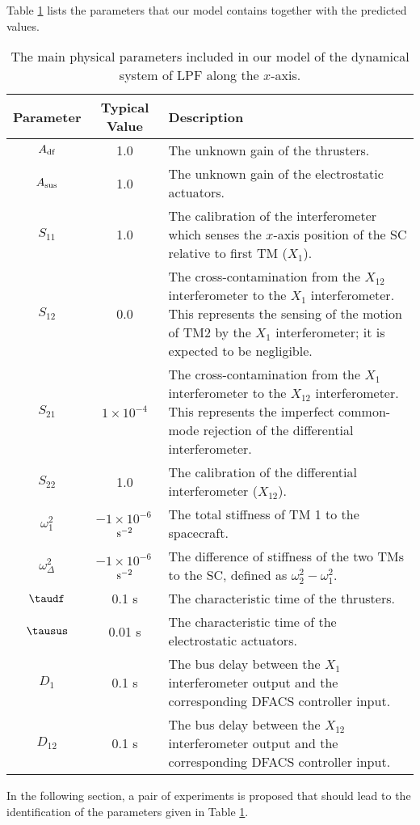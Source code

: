 Table \ref{tab:params} lists the parameters that our model contains together with the predicted values.
\begin{table}[htdp]
\begin{center}
  \small
\begin{tabular}{|c|c|p{8cm}|} \hline
	\rowcolor[rgb]{0.8,0.8,0.8} Parameter & Typical Value & Description \\ \hline \hline
    $A_{\rm df}$  & 1.0 & The unknown gain of the thrusters. \\ \hline
    $A_{\rm sus}$ & 1.0 & The unknown gain of the electrostatic actuators. \\ \hline
    $S_{11}$  & 1.0 & The calibration of the interferometer which
senses the $x$-axis position of the SC relative to first TM ($X_1$). \\ \hline 
    $S_{12}$ & 0.0 & The cross-contamination from the $X_{12}$
interferometer to the $X_{1}$ interferometer. This represents the sensing of the motion of TM2 by the $X_1$ interferometer; it is expected to be negligible. \\ \hline
    $S_{21}$  & $1\times10^{-4}$ & The cross-contamination from the $X_{1}$ interferometer
to the $X_{12}$ interferometer. This represents the imperfect common-mode
rejection of the differential interferometer. \\ \hline
    $S_{22}$ & 1.0 & The calibration of the differential interferometer
($X_{12}$). \\ \hline
    $\omega_1^2$  & $-1\times10^{-6}$\,${\rm s}^{-2}$ & The total stiffness of TM 1 to the spacecraft. \\ \hline
    $\omega_{\Delta}^2$  & $-1\times10^{-6}$\,${\rm s}^{-2}$ & The difference of stiffness 
of the two TMs to the SC, defined as $\omega_{2}^2-\omega_1^2$. \\ \hline
    $\taudf$ & 0.1 s& The characteristic time of the thrusters. \\ \hline
    $\tausus$ & 0.01 s& The characteristic time of the electrostatic actuators. \\ \hline
    $D_{1}$  & 0.1 s& The bus delay between the $X_1$ interferometer output and the corresponding DFACS controller input. \\ \hline
    $D_{12}$  & 0.1 s& The bus delay between the $X_{12}$ interferometer output and the corresponding DFACS controller input. \\ \hline
\end{tabular}
\end{center}
\caption{The main physical parameters included in our model of the dynamical system 
of LPF along the $x$-axis.}
\label{tab:params}
\end{table}
In the following section, a pair of experiments is proposed that should lead to
the identification of the parameters given in Table \ref{tab:params}. 







